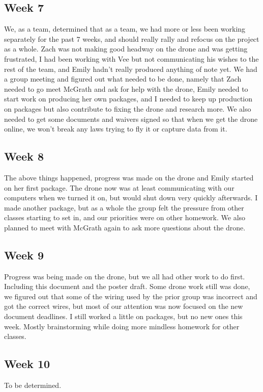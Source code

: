 \documentclass[IEEEtran,letterpaper,10pt,notitlepage,draftclsnofoot,onecolumn]{article}
\begin{document}
\subsection{Week 7}
We, as a team, determined that as a team, we had more or less been working separately for the past 7 weeks, and should really rally and refocus on the project as a whole. 
Zach was not making good headway on the drone and was getting frustrated, I had been working with Vee but not communicating his wishes to the rest of the team, and Emily hadn't really
produced anything of note yet. We had a group meeting and figured out what needed to be done, namely that Zach needed to go meet McGrath and ask for help with the drone, Emily needed to 
start work on producing her own packages, and I needed to keep up production on packages but also contribute to fixing the drone and research more. We also needed to get some documents 
and waivers signed so that when we get the drone online, we won't break any laws trying to fly it or capture data from it.

\subsection{Week 8}
The above things happened, progress was made on the drone and Emily started on her first package. The drone now was at least communicating with our computers when we turned it on,
but would shut down very quickly afterwards. I made another package, but as a whole the group felt the pressure from other classes starting to set in, and our priorities were on other homework. 
We also planned to meet with McGrath again to ask more questions about the drone.

\subsection{Week 9}
Progress was being made on the drone, but we all had other work to do first. Including this document and the poster draft. Some drone work still was done, we figured out that some of the wiring 
used by the prior group was incorrect and got the correct wires, but most of our attention was now focused on the new document deadlines. I still worked a little on packages, but no new ones this week.
Mostly brainstorming while doing more mindless homework for other classes.

\subsection{Week 10}
To be determined.
\end{document}
